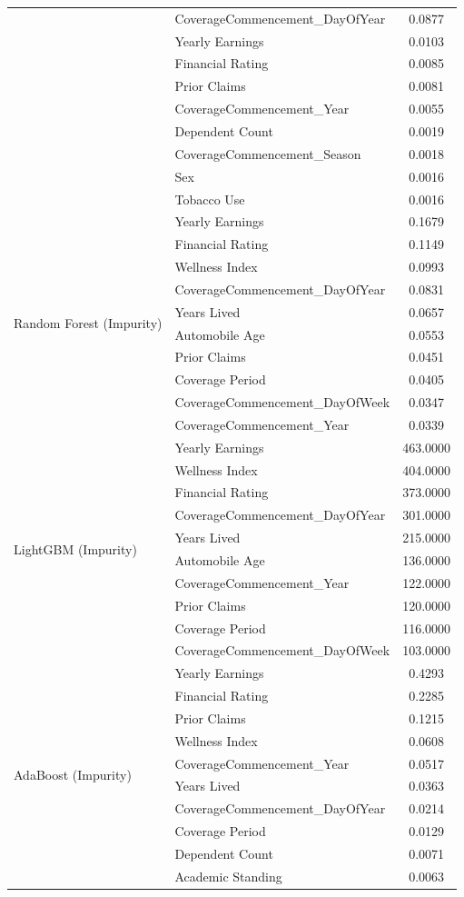 \documentclass[a4paper,12pt]{article}
\begin{document}
\begin{table}[H]
{\begin{tabular}{|l|l|c|}
  & CoverageCommencement\_DayOfYear & 0.0877 \\
  & Yearly Earnings & 0.0103 \\
  & Financial Rating & 0.0085 \\
  & Prior Claims & 0.0081 \\
  & CoverageCommencement\_Year & 0.0055 \\
  & Dependent Count & 0.0019 \\
  & CoverageCommencement\_Season & 0.0018 \\
  & Sex & 0.0016 \\
  & Tobacco Use & 0.0016 \\
\hline
\multirow{10}{*}{Random Forest (Impurity)} 
  & Yearly Earnings & 0.1679 \\
  & Financial Rating & 0.1149 \\
  & Wellness Index & 0.0993 \\
  & CoverageCommencement\_DayOfYear & 0.0831 \\
  & Years Lived & 0.0657 \\
  & Automobile Age & 0.0553 \\
  & Prior Claims & 0.0451 \\
  & Coverage Period & 0.0405 \\
  & CoverageCommencement\_DayOfWeek & 0.0347 \\
  & CoverageCommencement\_Year & 0.0339 \\
\hline
\multirow{10}{*}{LightGBM (Impurity)} 
  & Yearly Earnings & 463.0000 \\
  & Wellness Index & 404.0000 \\
  & Financial Rating & 373.0000 \\
  & CoverageCommencement\_DayOfYear & 301.0000 \\
  & Years Lived & 215.0000 \\
  & Automobile Age & 136.0000 \\
  & CoverageCommencement\_Year & 122.0000 \\
  & Prior Claims & 120.0000 \\
  & Coverage Period & 116.0000 \\
  & CoverageCommencement\_DayOfWeek & 103.0000 \\
\hline
\multirow{10}{*}{AdaBoost (Impurity)} 
  & Yearly Earnings & 0.4293 \\
  & Financial Rating & 0.2285 \\
  & Prior Claims & 0.1215 \\
  & Wellness Index & 0.0608 \\
  & CoverageCommencement\_Year & 0.0517 \\
  & Years Lived & 0.0363 \\
  & CoverageCommencement\_DayOfYear & 0.0214 \\
  & Coverage Period & 0.0129 \\
  & Dependent Count & 0.0071 \\
  & Academic Standing & 0.0063 \\
\hline
\end{tabular}%
\label{tab:tab_2}
}
\end{table}
\end{document}
